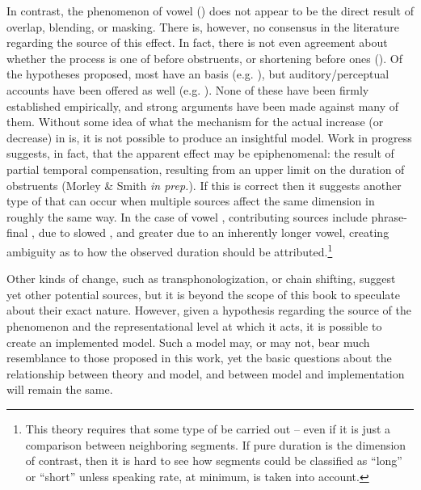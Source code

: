 In contrast, the phenomenon of vowel  ()
does not appear to be the direct result of overlap, blending, or masking.
There is, however, no consensus in the literature regarding the 
source of this effect. In fact, there is not even agreement about
whether the process is one of  before  obstruents,
or shortening before  ones (\citealt{gimson1970introduction,wells1982accents}).
Of the hypotheses proposed, most have an  basis (e.g.
\citealt{belasco1958variations,delattre1962some,chen1970vowel,lisker1974explaining,Klatt1976,moreton2004realization,schwartz2010phonology}),
but auditory/perceptual accounts have been offered as well (e.g.
\citealt{lisker1957closure,javkin1977phonetic,Kluender1988}). None
of these have been firmly established empirically, and strong arguments
have been made against many of them. Without some idea of what the
mechanism for the actual increase (or decrease) in  is, it is
not possible to produce an insightful model. Work in progress suggests,
in fact, that the apparent  effect may be epiphenomenal:
the result of partial temporal compensation, resulting from an upper
limit on the duration of  obstruents (Morley \& Smith \emph{in
prep.}). If this is correct then it suggests another type of 
that can occur when multiple sources affect the same  dimension
in roughly the same way. In the case of vowel , contributing
sources include phrase-final ,  due to slowed
, and greater  due to an inherently longer vowel,
creating ambiguity as to how the observed duration should be attributed.\footnote{This theory requires that some type of  be carried out
– even if it is just a comparison between neighboring segments. If
pure duration is the dimension of contrast, then it is hard to see
how segments could be classified as ``long'' or ``short'' unless speaking
rate, at minimum, is taken into account.}

Other kinds of change, such as transphonologization, or chain shifting,
suggest yet other potential sources, but it is beyond the scope
of this book to speculate about their exact nature. However, given
a hypothesis regarding the source of the phenomenon and the representational
level at which it acts, it is possible to create an implemented model.
Such a model may, or may not, bear much resemblance to those proposed
in this work, yet the basic questions about the relationship between
theory and model, and between model and implementation will remain
the same. 

